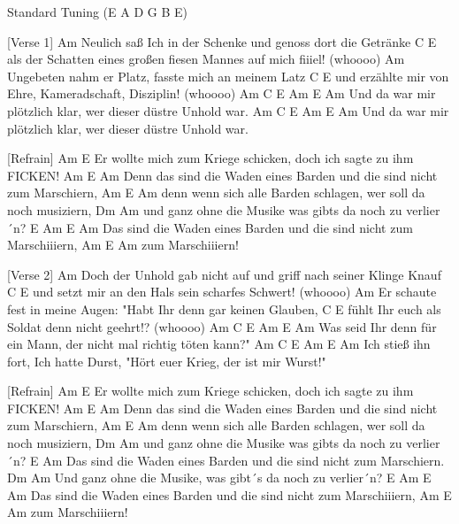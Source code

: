 Standard Tuning (E A D G B E)

[Verse 1]
Am
Neulich saß Ich in der Schenke
und genoss dort die Getränke
         C                                           E
als der Schatten eines großen fiesen Mannes auf mich fiiiel! (whoooo)
Am
Ungebeten nahm er Platz,
fasste mich an meinem Latz
       C                                        E
und erzählte mir von Ehre, Kameradschaft, Disziplin! (whoooo)
Am              C                   E            Am E  Am
Und da war mir plötzlich klar, wer dieser düstre Unhold war.
Am              C                   E            Am E  Am
Und da war mir plötzlich klar, wer dieser düstre Unhold war.

[Refrain]
Am                                                        E
Er wollte mich zum Kriege schicken, doch ich sagte zu ihm FICKEN!
                  Am          E                                  Am
Denn das sind die Waden eines Barden und die sind nicht zum Marschiern,
               Am          E                              Am
denn wenn sich alle Barden schlagen, wer soll da noch musiziern,
         Dm                        Am
und ganz ohne die Musike was gibts da noch zu verlier´n?
             E                                            Am  E Am
Das sind die Waden eines Barden und die sind nicht zum Marschiiiern,
       Am  E Am
zum Marschiiiern!

[Verse 2]
Am
Doch der Unhold gab nicht auf
und griff nach seiner Klinge Knauf
    C                                   E
und setzt mir an den Hals sein scharfes Schwert! (whoooo)
Am
Er schaute fest in meine Augen:
"Habt Ihr denn gar keinen Glauben,
      C                                E
fühlt Ihr euch als Soldat denn nicht geehrt!? (whoooo)
Am                C                 E                 Am E  Am
Was seid Ihr denn für ein Mann, der nicht mal richtig töten kann?"
Am                      C                  E               Am  E   Am
Ich stieß ihn fort, Ich hatte Durst, "Hört euer Krieg, der ist mir Wurst!"

[Refrain]
Am                                                        E
Er wollte mich zum Kriege schicken, doch ich sagte zu ihm FICKEN!
                  Am          E                                Am
Denn das sind die Waden eines Barden und die sind nicht zum Marschiern,
               Am             E                           Am
denn wenn sich alle Barden schlagen, wer soll da noch musiziern,
         Dm                        Am
und ganz ohne die Musike was gibts da noch zu verlier´n?
             E                                         Am
Das sind die Waden eines Barden und die sind nicht zum Marschiern.
         Dm                          Am
Und ganz ohne die Musike, was gibt´s da noch zu verlier´n?
             E                                            Am  E Am
Das sind die Waden eines Barden und die sind nicht zum Marschiiiern,
       Am  E Am
zum Marschiiiern!


